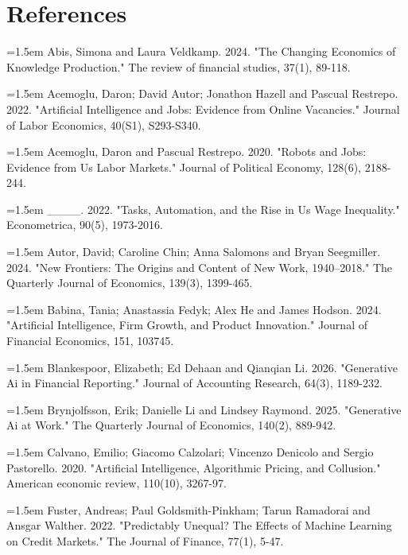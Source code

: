 \documentclass[11pt,a4paper]{article}
\begin{document}
\clearpage
\section*{References}
\noindent\hangindent=1.5em Abis, Simona and Laura Veldkamp. 2024. "The Changing Economics of Knowledge Production." The review of financial studies, 37(1), 89-118.\par
\noindent\hangindent=1.5em Acemoglu, Daron; David Autor; Jonathon Hazell and Pascual Restrepo. 2022. "Artificial Intelligence and Jobs: Evidence from Online Vacancies." Journal of Labor Economics, 40(S1), S293-S340.\par
\noindent\hangindent=1.5em Acemoglu, Daron and Pascual Restrepo. 2020. "Robots and Jobs: Evidence from Us Labor Markets." Journal of Political Economy, 128(6), 2188-244.\par
\noindent\hangindent=1.5em \_\_\_\_. 2022. "Tasks, Automation, and the Rise in Us Wage Inequality." Econometrica, 90(5), 1973-2016.\par
\noindent\hangindent=1.5em Autor, David; Caroline Chin; Anna Salomons and Bryan Seegmiller. 2024. "New Frontiers: The Origins and Content of New Work, 1940--2018." The Quarterly Journal of Economics, 139(3), 1399-465.\par
\noindent\hangindent=1.5em Babina, Tania; Anastassia Fedyk; Alex He and James Hodson. 2024. "Artificial Intelligence, Firm Growth, and Product Innovation." Journal of Financial Economics, 151, 103745.\par
\noindent\hangindent=1.5em Blankespoor, Elizabeth; Ed Dehaan and Qianqian Li. 2026. "Generative Ai in Financial Reporting." Journal of Accounting Research, 64(3), 1189-232.\par
\noindent\hangindent=1.5em Brynjolfsson, Erik; Danielle Li and Lindsey Raymond. 2025. "Generative Ai at Work." The Quarterly Journal of Economics, 140(2), 889-942.\par
\noindent\hangindent=1.5em Calvano, Emilio; Giacomo Calzolari; Vincenzo Denicolo and Sergio Pastorello. 2020. "Artificial Intelligence, Algorithmic Pricing, and Collusion." American economic review, 110(10), 3267-97.\par
\noindent\hangindent=1.5em Fuster, Andreas; Paul Goldsmith-Pinkham; Tarun Ramadorai and Ansgar Walther. 2022. "Predictably Unequal? The Effects of Machine Learning on Credit Markets." The Journal of Finance, 77(1), 5-47.\par
\end{document}
